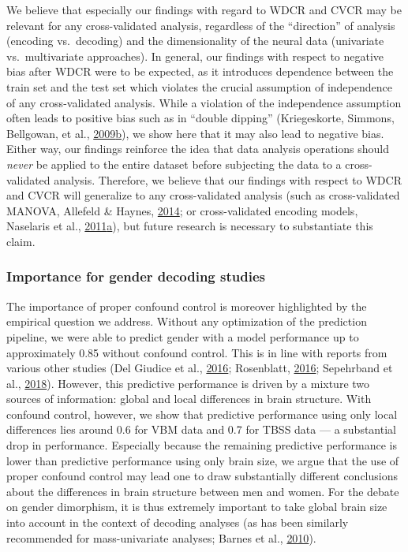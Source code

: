 \documentclass[11pt,american,a4paper,oneside,]{memoir} %
\begin{document}
We believe that especially our findings with regard to WDCR and CVCR may be relevant for any cross-validated analysis, regardless of the ``direction'' of analysis (encoding vs.~decoding) and the dimensionality of the neural data (univariate vs.~multivariate approaches). In general, our findings with respect to negative bias after WDCR were to be expected, as it introduces dependence between the train set and the test set which violates the crucial assumption of independence of any cross-validated analysis. While a violation of the independence assumption often leads to positive bias such as in ``double dipping'' (Kriegeskorte, Simmons, Bellgowan, et al., \protect\hyperlink{ref-Kriegeskorte2009-yz}{2009}\protect\hyperlink{ref-Kriegeskorte2009-yz}{b}), we show here that it may also lead to negative bias. Either way, our findings reinforce the idea that data analysis operations should \emph{never} be applied to the entire dataset before subjecting the data to a cross-validated analysis. Therefore, we believe that our findings with respect to WDCR and CVCR will generalize to any cross-validated analysis (such as cross-validated MANOVA, Allefeld \& Haynes, \protect\hyperlink{ref-allefeld2014searchlight}{2014}; or cross-validated encoding models, Naselaris et al., \protect\hyperlink{ref-naselaris2011encoding}{2011}\protect\hyperlink{ref-naselaris2011encoding}{a}), but future research is necessary to substantiate this claim.

\hypertarget{importance-for-gender-decoding-studies}{%
\subsubsection{Importance for gender decoding studies}\label{importance-for-gender-decoding-studies}}

The importance of proper confound control is moreover highlighted by the empirical question we address. Without any optimization of the prediction pipeline, we were able to predict gender with a model performance up to approximately 0.85 without confound control. This is in line with reports from various other studies (Del Giudice et al., \protect\hyperlink{ref-Del_Giudice2016-ns}{2016}; Rosenblatt, \protect\hyperlink{ref-Rosenblatt2016-oy}{2016}; Sepehrband et al., \protect\hyperlink{ref-Sepehrband2018-dy}{2018}). However, this predictive performance is driven by a mixture two sources of information: global and local differences in brain structure. With confound control, however, we show that predictive performance using only local differences lies around 0.6 for VBM data and 0.7 for TBSS data --- a substantial drop in performance. Especially because the remaining predictive performance is lower than predictive performance using only brain size, we argue that the use of proper confound control may lead one to draw substantially different conclusions about the differences in brain structure between men and women. For the debate on gender dimorphism, it is thus extremely important to take global brain size into account in the context of decoding analyses (as has been similarly recommended for mass-univariate analyses; Barnes et al., \protect\hyperlink{ref-Barnes2010-pu}{2010}).
\end{document}
